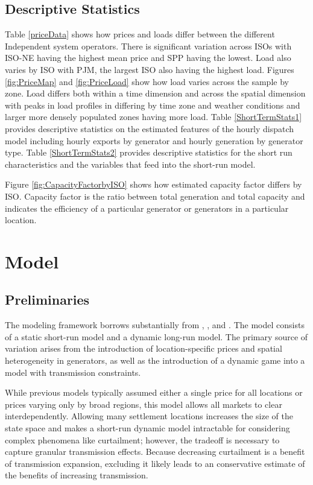 \documentclass[12pt]{article}
\begin{document}
\subsection{Descriptive Statistics}

Table \ref{priceData} shows how prices and loads differ between the different Independent system operators. There is significant variation across ISOs with ISO-NE having the highest mean price and SPP having the lowest. Load also varies by ISO with PJM, the largest ISO also having the highest load. Figures \ref{fig:PriceMap} and \ref{fig:PriceLoad} show how load varies across the sample by zone. Load differs both within a time dimension and across the spatial dimension with peaks in load profiles in differing by time zone and weather conditions and larger more densely populated zones having more load. Table \ref{ShortTermStats1} provides descriptive statistics on the estimated features of the hourly dispatch model including hourly exports by generator and hourly generation by generator type. Table \ref{ShortTermStats2} provides descriptive statistics for the short run characteristics and the variables that feed into the short-run model.

Figure \ref{fig:CapacityFactorbyISO} shows how estimated capacity factor differs by ISO. Capacity factor is the ratio between total generation and total capacity and indicates the efficiency of a particular generator or generators in a particular location.

\section{Model} \label{sec:Model}

\subsection{Preliminaries}

The modeling framework borrows substantially from \cite{butters2021soaking}, \cite{elliott2022investment}, and \cite{gonzales2022dynamic}. The model consists of a static short-run model and a dynamic long-run model. The primary source of variation arises from the introduction of location-specific prices and spatial heterogeneity in generators, as well as the introduction of a dynamic game into a model with transmission constraints.

While previous models typically assumed either a single price for all locations or prices varying only by broad regions, this model allows all markets to clear interdependently. Allowing many settlement locations increases the size of the state space and makes a short-run dynamic model intractable for considering complex phenomena like curtailment; however, the tradeoff is necessary to capture granular transmission effects. Because decreasing curtailment is a benefit of transmission expansion, excluding it likely leads to an conservative estimate of the benefits of increasing transmission.
\end{document}
